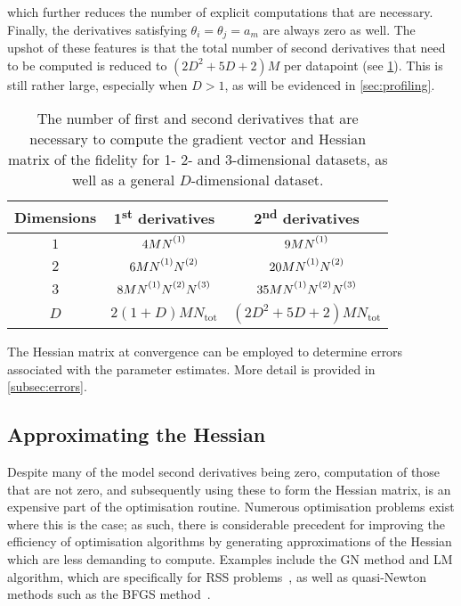 which further reduces the number of explicit computations that are necessary.
Finally, the derivatives satisfying $\theta_i = \theta_j = a_m$ are always
zero as well. The upshot of these features is that the total number of second
derivatives that need to be computed is reduced to $(2D^2 + 5D + 2)M$ per
datapoint (see \cref{tab:number-of-derivatives}). This is still rather large,
especially when $D>1$, as will be evidenced in \cref{sec:profiling}.
\begin{table}
    \begin{center}
        \begin{tabular}{ c c c }
            \toprule
            Dimensions &
                \raisebox{\depth}{\#} 1\textsuperscript{st} derivatives &
                \raisebox{\depth}{\#} 2\textsuperscript{nd} derivatives\\
            \midrule
            $1$ & $4M\None$ & $9M\None$\\
            $2$ & $6M\None\Ntwo$ & $20M\None\Ntwo$\\
            $3$ & $8M\None\Ntwo\Nthree$ & $35M\None\Ntwo\Nthree$\\
            $D$ &  $2(1 + D)M N_{\text{tot}}$ &  $(2D^2 + 5D + 2) M N_{\text{tot}}$\\
            \bottomrule
        \end{tabular}
    \end{center}
    \caption{
        The number of first and second derivatives that are necessary to
        compute the gradient vector and Hessian matrix of the fidelity for
        1- 2- and 3-dimensional datasets, as well as a general $D$-dimensional
        dataset.
    }
    \label{tab:number-of-derivatives}
\end{table}

The Hessian matrix at convergence can be employed to determine errors
associated with the parameter estimates. More detail is provided in
\cref{subsec:errors}.

\subsection{Approximating the Hessian}
\label{subsec:hess-approx}
Despite many of the model second derivatives being zero, computation of those
that are not zero, and subsequently using these to form the Hessian matrix,
is an expensive part of the optimisation routine.
Numerous optimisation problems exist where this is the case; as such,
there is considerable precedent for improving the efficiency of optimisation
algorithms by generating approximations of the Hessian which are less demanding
to compute.
Examples include the \ac{GN} method and \ac{LM} algorithm,
which are specifically for \ac{RSS} problems~\cite[Chapter
10]{Nocedal2006}, as well as quasi-Newton methods such as the \ac{BFGS}
method~\cite[Chapter 6]{Nocedal2006}.

